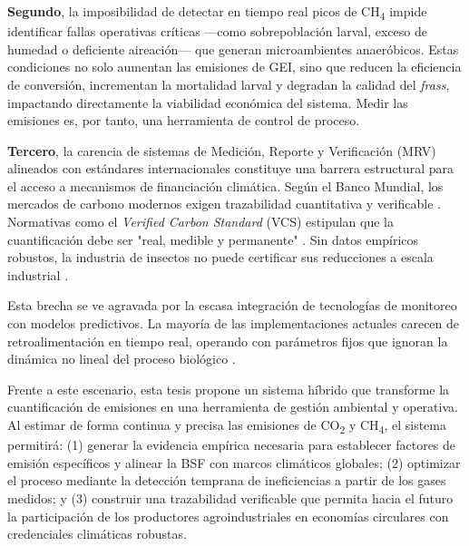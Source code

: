 \textbf{Segundo}, la imposibilidad de detectar en tiempo real picos de CH\textsubscript{4} impide identificar fallas operativas críticas —como sobrepoblación larval, exceso de humedad o deficiente aireación— que generan microambientes anaeróbicos. Estas condiciones no solo aumentan las emisiones de GEI, sino que reducen la eficiencia de conversión, incrementan la mortalidad larval y degradan la calidad del \textit{frass}, impactando directamente la viabilidad económica del sistema. Medir las emisiones es, por tanto, una herramienta de control de proceso.

\textbf{Tercero}, la carencia de sistemas de Medición, Reporte y Verificación (MRV) alineados con estándares internacionales constituye una barrera estructural para el acceso a mecanismos de financiación climática. Según el Banco Mundial, los mercados de carbono modernos exigen trazabilidad cuantitativa y verificable \parencite{worldbankStateTrendsCarbon2023}. Normativas como el \textit{Verified Carbon Standard} (VCS) estipulan que la cuantificación debe ser "real, medible y permanente" \parencite{VCSStandardv47FINAL41524}. Sin datos empíricos robustos, la industria de insectos no puede certificar sus reducciones a escala industrial \parencite{smetanaSustainableUseHermetia2019a}.

Esta brecha se ve agravada por la escasa integración de tecnologías de monitoreo con modelos predictivos. La mayoría de las implementaciones actuales carecen de retroalimentación en tiempo real, operando con parámetros fijos que ignoran la dinámica no lineal del proceso biológico \parencite{kamilarisReviewPracticeBig2017,liuOptimizingDataPipelines2023a}.

Frente a este escenario, esta tesis propone un sistema híbrido que transforme la cuantificación de emisiones en una herramienta de gestión ambiental y operativa. Al estimar de forma continua y precisa las emisiones de CO\textsubscript{2} y CH\textsubscript{4}, el sistema permitirá: (1) generar la evidencia empírica necesaria para establecer factores de emisión específicos y alinear la BSF con marcos climáticos globales; (2) optimizar el proceso mediante la detección temprana de ineficiencias a partir de los gases medidos; y (3) construir una trazabilidad verificable que permita hacia el futuro la participación de los productores agroindustriales en economías circulares con credenciales climáticas robustas.